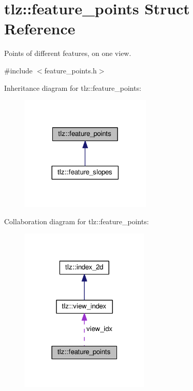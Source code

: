 \hypertarget{structtlz_1_1feature__points}{}\section{tlz\+:\+:feature\+\_\+points Struct Reference}
\label{structtlz_1_1feature__points}


Points of different features, on one view.  




{\ttfamily \#include $<$feature\+\_\+points.\+h$>$}



Inheritance diagram for tlz\+:\+:feature\+\_\+points\+:
\nopagebreak
\begin{figure}[H]
\begin{center}
\leavevmode
\includegraphics[width=177pt]{structtlz_1_1feature__points__inherit__graph}
\end{center}
\end{figure}


Collaboration diagram for tlz\+:\+:feature\+\_\+points\+:
\nopagebreak
\begin{figure}[H]
\begin{center}
\leavevmode
\includegraphics[width=175pt]{structtlz_1_1feature__points__coll__graph}
\end{center}
\end{figure}
